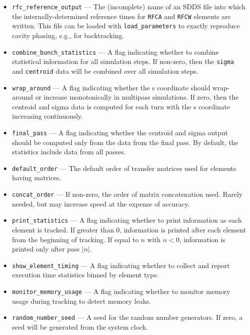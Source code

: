 \documentclass[11pt]{article}
\begin{document}
\begin{itemize}
  result from a saved parameter file.
  Another, more serious, risk is that the parameter file may not reflect changes made via, e.g.,
  \verb|alter_elements| or \verb|load_parameters| if those changes {\em restore} default 
  values for quantities that have non-default values in the lattice file.
  Users are warned to use this feature with caution.
\item \verb|rfc_reference_output| --- The (incomplete) name of an SDDS file into
which the internally-determined reference times for \verb|RFCA| and \verb|RFCW| 
elements are written. This file can be loaded with \verb|load_parameters| to
exactly reproduce cavity phasing, e.g., for backtracking.
\item \verb|combine_bunch_statistics| --- A flag indicating whether to
combine statistical information for all simulation steps.  If
non-zero, then the \verb|sigma| and \verb|centroid| data will be
combined over all simulation steps.
\item \verb|wrap_around| --- A flag indicating whether the s
 coordinate should wrap-around or increase monotonically in multipass
 simulations.  If zero, then the centroid and sigma data is computed for
 each turn with the s coordinate increasing continuously.
\item \verb|final_pass| --- A flag indicating whether the centroid and
 sigma output should be computed only from the data from the final pass.
 By default, the statistics include data from all passes.
\item \verb|default_order| --- The default order of transfer matrices
used for elements having matrices.
\item \verb|concat_order| --- If non-zero, the order of matrix concatenation used. Rarely needed, but may increase
  speed at the expense of accuracy.
\item \verb|print_statistics| --- A flag indicating whether to print
information as each element is tracked. If greater than 0, information is printed after each element from the beginning of tracking.
If equal to $n$ with $n<0$, information is printed only after pass $\left|n\right|$.
\item \verb|show_element_timing| --- A flag indicating whether to collect and report execution time statistics binned by element type.
\item \verb|monitor_memory_usage| --- A flag indicating whether to monitor memory usage during tracking to detect memory leaks.
\item \verb|random_number_seed| --- A seed for the random number generators.  If zero, a seed will be generated from the system clock.

\end{itemize}
\end{document}
